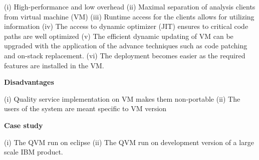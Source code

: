 \begin{compactitem}
(i)	High-performance and low overhead
(ii)	Maximal separation of analysis clients from virtual machine (VM)
(iii)	Runtime access for the clients allows for utilizing information
(iv)	The access to dynamic optimizer (JIT) ensures to critical code paths are well optimized
(v)	The efficient dynamic updating of VM can be upgraded with the application of the advance techniques such as code patching and on-stack replacement.  
(vi)	The deployment becomes easier as the required features are installed in the VM.


\item[\textbf{Disadvantages}] 

(i)	    Quality service implementation on VM makes them non-portable
(ii)	The users of the system are meant specific to VM version

\item[\textbf{Case study}] 

(i)	The QVM run on eclipse
(ii)	The QVM run on development version of a large scale IBM product. 

\end{compactitem}





